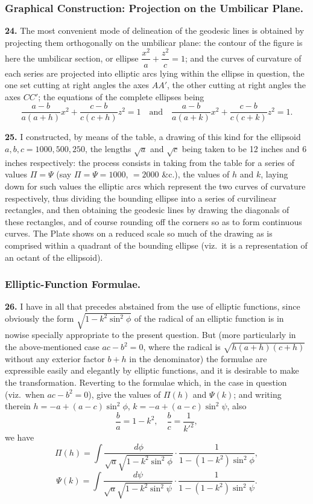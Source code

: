 \documentclass[11pt,a4paper]{article}
\begin{document}
\subsubsection*{Graphical Construction: Projection on the Umbilicar Plane.}

\noindent\textbf{24.} The most convenient mode of delineation of the geodesic lines is obtained by projecting them orthogonally on the umbilicar plane: the contour of the figure is here the umbilicar section, or ellipse $\dfrac{x^{2}}{a} + \dfrac{z^{2}}{c} = 1$; and the curves of curvature of each series are projected into elliptic arcs lying within the ellipse in question, the one set cutting at right angles the axes $AA'$, the other cutting at right angles the axes $CC'$; the equations of the complete ellipses being
\[
\frac{a-b}{a(a+h)} x^{2} + \frac{c-b}{c(c+h)} z^{2} = 1 \quad \text{and} \quad \frac{a-b}{a(a+k)} x^{2} + \frac{c-b}{c(c+k)} z^{2} = 1.
\]

\noindent\textbf{25.} I constructed, by means of the table, a drawing of this kind for the ellipsoid $a, b, c = 1000, 500, 250$, the lengths $\sqrt{a}$ and $\sqrt{c}$ being taken to be 12 inches and 6 inches respectively: the process consists in taking from the table for a series of values $\Pi = \Psi$ (say $\Pi = \Psi = 1000$, $= 2000$ \&c.), the values of $h$ and $k$, laying down for such values the elliptic arcs which represent the two curves of curvature respectively, thus dividing the bounding ellipse into a series of curvilinear rectangles, and then obtaining the geodesic lines by drawing the diagonals of these rectangles, and of course rounding off the corners so as to form continuous curves. The Plate shows on a reduced scale so much of the drawing as is comprised within a quadrant of the bounding ellipse (viz.\ it is a representation of an octant of the ellipsoid).

\subsubsection*{Elliptic-Function Formulae.}

\noindent\textbf{26.} I have in all that precedes abstained from the use of elliptic functions, since obviously the form $\sqrt{1 - k^{2}\sin^{2}\phi}$ of the radical of an elliptic function is in nowise specially appropriate to the present question. But (more particularly in the above-mentioned case $ac - b^{2} = 0$, where the radical is $\sqrt{h(a+h)(c+h)}$ without any exterior factor $b+h$ in the denominator) the formulae are expressible easily and elegantly by elliptic functions, and it is desirable to make the transformation. Reverting to the formulae which, in the case in question (viz.\ when $ac - b^{2} = 0$), give the values of $\Pi(h)$ and $\Psi(k)$; and writing therein $h = -a + (a-c)\sin^{2}\phi$, $k = -a + (a-c)\sin^{2}\psi$, also
\[
\frac{b}{a} = 1 - k^{2}, \quad \frac{b}{c} = \frac{1}{k'^{2}},
\]
we have
\[
\Pi(h) = \int \frac{d\phi}{\sqrt{a} \sqrt{1 - k^{2}\sin^{2}\phi}} \cdot \frac{1}{1 - (1-k^{2})\sin^{2}\phi},
\]
\[
\Psi(k) = \int \frac{d\psi}{\sqrt{a} \sqrt{1 - k^{2}\sin^{2}\psi}} \cdot \frac{1}{1 - (1-k^{2})\sin^{2}\psi}.
\]
\end{document}

